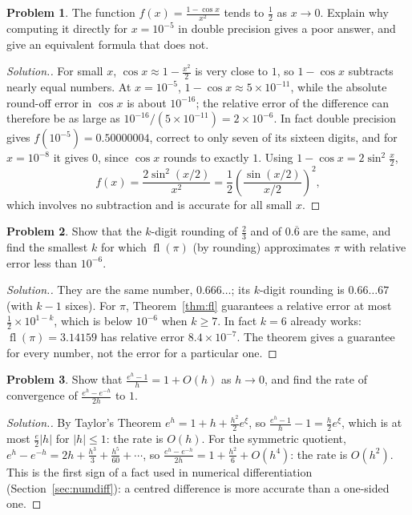 \documentclass[11pt,a4paper]{article}
\numberwithin{equation}{section}
\DeclareMathOperator{\fl}{fl}
\theoremstyle{definition}
\newtheorem{problemx}{Problem}[subsection]
\newenvironment{problem}{\begin{problemx}}{\end{problemx}}
\newenvironment{solution}
  {\renewcommand{\qedsymbol}{}\begin{proof}[\textit{Solution}.]}
  {\end{proof}}
\begin{document}
\begin{problem}
The function $f(x) = \frac{1-\cos x}{x^2}$ tends to $\frac12$ as $x\longrightarrow0$. Explain why computing it directly for $x = 10^{-5}$
in double precision gives a poor answer, and give an equivalent formula that does not.
\end{problem}
\begin{solution}
For small $x$, $\cos x\approx1-\frac{x^2}{2}$ is very close to $1$, so $1-\cos x$ subtracts nearly equal numbers. At $x = 10^{-5}$,
$1-\cos x\approx5\times10^{-11}$, while the absolute round-off error in $\cos x$ is about $10^{-16}$; the relative error of the difference can therefore be as large as $10^{-16}/(5\times10^{-11}) = 2\times10^{-6}$. In fact double precision
gives $f(10^{-5}) = 0.50000004$, correct to only seven of its sixteen digits, and for $x = 10^{-8}$ it gives $0$, since $\cos x$ rounds
to exactly $1$. Using $1-\cos x = 2\sin^2\frac{x}{2}$,
$$f(x) = \frac{2\sin^2(x/2)}{x^2} = \frac12\left(\frac{\sin(x/2)}{x/2}\right)^2,$$
which involves no subtraction and is accurate for all small $x$.
\end{solution}

\begin{problem}
Show that the $k$-digit rounding of $\frac23$ and of $0.\overline{6}$ are the same, and find the smallest $k$ for which $\fl(\pi)$ (by
rounding) approximates $\pi$ with relative error less than $10^{-6}$.
\end{problem}
\begin{solution}
They are the same number, $0.666\ldots$; its $k$-digit rounding is $0.66\ldots67$ (with $k-1$ sixes). For $\pi$, Theorem~\ref{thm:fl}
guarantees a relative error at most $\frac12\times10^{1-k}$, which is below $10^{-6}$ when $k\geq7$. In fact $k = 6$ already works:
$\fl(\pi) = 3.14159$ has relative error $8.4\times10^{-7}$. The theorem gives a guarantee for every number, not the error for a
particular one.
\end{solution}

\begin{problem}
Show that $\frac{e^h-1}{h} = 1+O(h)$ as $h\longrightarrow0$, and find the rate of convergence of $\frac{e^h-e^{-h}}{2h}$ to $1$.
\end{problem}
\begin{solution}
By Taylor's Theorem $e^h = 1+h+\frac{h^2}{2}e^{\xi}$, so $\frac{e^h-1}{h}-1 = \frac h2e^\xi$, which is at most $\frac{e}{2}|h|$ for $|h|\leq
1$: the rate is $O(h)$. For the symmetric quotient, $e^h-e^{-h} = 2h+\frac{h^3}{3}+\frac{h^5}{60}+\cdots$, so $\frac{e^h-e^{-h}}{2h} =
1+\frac{h^2}{6}+O(h^4)$: the rate is $O(h^2)$. This is the first sign of a fact used in numerical differentiation (Section~\ref{sec:numdiff}): a centred difference is
more accurate than a one-sided one.
\end{solution}
\end{document}
